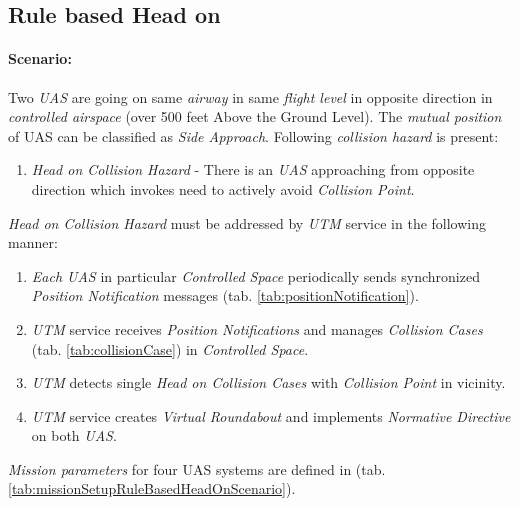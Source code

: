 \newpage
\subsection{Rule based Head on}\label{s:testRuleHeadOn}

\paragraph{Scenario:} Two \emph{UAS} are going on same \emph{airway} in same \emph{flight level} in opposite direction in \emph{controlled airspace} (over 500 feet Above the Ground Level). The \emph{mutual position} of UAS can be classified as \emph{Side Approach}. Following \emph{collision hazard} is present:

\begin{enumerate}
    \item \emph{Head on Collision Hazard} - There is an \emph{UAS} approaching from opposite direction which invokes need to actively avoid \emph{Collision Point}.
\end{enumerate}
      
\noindent\emph{Head on Collision Hazard} must be addressed by \emph{UTM} service in the following manner:
    
\begin{enumerate}
    \item \emph{Each UAS} in particular \emph{Controlled Space} periodically sends synchronized \emph{Position Notification} messages (tab. \ref{tab:positionNotification}). 
    
    \item \emph{UTM} service receives \emph{Position Notifications} and manages \emph{Collision Cases} (tab. \ref{tab:collisionCase}) in \emph{Controlled Space}. 
    
    \item \emph{UTM} detects single \emph{Head on Collision Cases} with \emph{Collision Point} in  vicinity.
    
    \item \emph{UTM} service creates \emph{Virtual Roundabout} and implements \emph{Normative Directive} on both \emph{UAS}.
\end{enumerate}

\noindent\emph{Mission parameters} for four UAS systems are defined in (tab. \ref{tab:missionSetupRuleBasedHeadOnScenario}).

